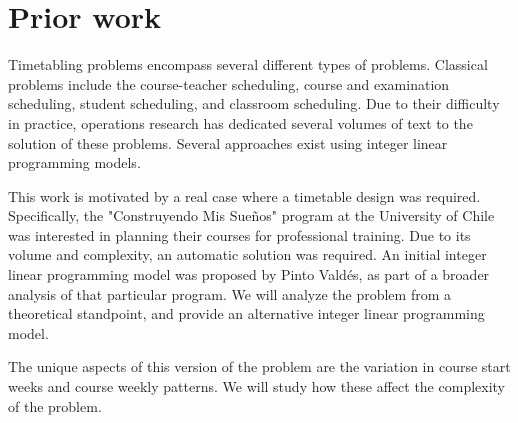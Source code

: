 \section{Prior work}

Timetabling problems encompass several different types of problems. Classical problems include the course-teacher scheduling\cite{dewerra}, course and examination scheduling\cite{carterlaporte}, student scheduling\cite{studentsched}, and classroom scheduling\cite{classroom}. Due to their difficulty in practice, operations research has dedicated several volumes of text to the solution of these problems. Several approaches exist using integer linear programming models.

This work is motivated by a real case where a timetable design was required. Specifically, the "Construyendo Mis Sueños" program at the University of Chile was interested in planning their courses for professional training. Due to its volume and complexity, an automatic solution was required. An initial integer linear programming model\cite{PintoValdes} was proposed by Pinto Valdés, as part of a broader analysis of that particular program. We will analyze the problem from a theoretical standpoint, and provide an alternative integer linear programming model.

The unique aspects of this version of the problem are the variation in course start weeks and course weekly patterns. We will study how these affect the complexity of the problem.
